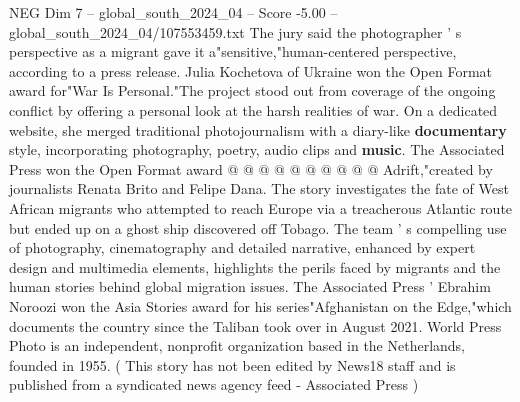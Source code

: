 \begin{textsample}{NEG Dim 7 – global\_south\_2024\_04 – Score -5.00 – global\_south\_2024\_04/107553459.txt}
The jury said the photographer ' s perspective as a migrant gave it a"sensitive,"human-centered perspective, according to a press release.
Julia Kochetova of Ukraine won the Open Format award for"War Is Personal."The project stood out from coverage of the ongoing conflict by offering a personal look at the harsh realities of war.
On a dedicated website, she merged traditional photojournalism with a diary-like \textbf{documentary} style, incorporating photography, poetry, audio clips and \textbf{music}.
The Associated Press won the Open Format award @ @ @ @ @ @ @ @ @ @ Adrift,"created by journalists Renata Brito and Felipe Dana.
The story investigates the fate of West African migrants who attempted to reach Europe via a treacherous Atlantic route but ended up on a ghost ship discovered off Tobago.
The team ' s compelling use of photography, cinematography and detailed narrative, enhanced by expert design and multimedia elements, highlights the perils faced by migrants and the human stories behind global migration issues.
The Associated Press ' Ebrahim Noroozi won the Asia Stories award for his series"Afghanistan on the Edge,"which documents the country since the Taliban took over in August 2021.
World Press Photo is an independent, nonprofit organization based in the Netherlands, founded in 1955. ( This story has not been edited by News18 staff and is published from a syndicated news agency feed - Associated Press )

\end{textsample}
